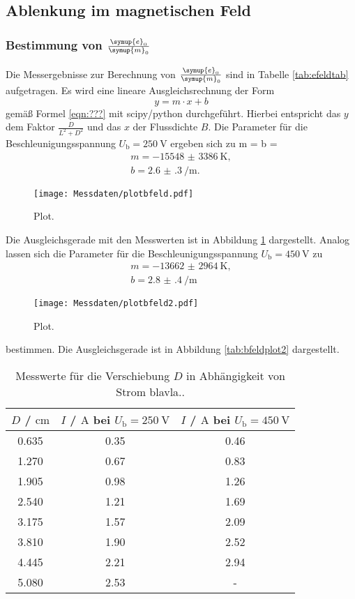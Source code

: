 \FloatBarrier
\subsection{Ablenkung im magnetischen Feld}

\subsubsection{Bestimmung von $\frac{\symup{e}_0}{\symup{m}_0}$}
Die Messergebnisse zur Berechnung von $\frac{\symup{e}_0}{\symup{m}_0}$ sind in Tabelle
\ref{tab:efeldtab} aufgetragen. Es wird eine lineare Ausgleichsrechnung der Form 
\begin{equation*}
	y = m \cdot x + b
\end{equation*}
gemäß Formel \eqref{eqn:???} mit scipy/python \cite{scipy} durchgeführt. Hierbei entspricht das
$y$ dem Faktor $\frac{D}{L^2+D^2}$ und das $x$ der Flussdichte $B$.
Die Parameter für die Beschleunigungsspannung $U_{\mathrm{b}}=\SI{250}{\volt}$ ergeben sich zu
m = b =  \begin{gather*}
	m = -\SI{15548(3386)}{\kelvin} \mathrm{,} \\
	b = \SI{2.6(3)}{\per\meter} \mathrm{.}
\end{gather*}
\begin{figure}
  \centering
  \texttt{[image: Messdaten/plotbfeld.pdf]}
  \caption{Plot.}
  \label{fig:bfeldplot}
\end{figure}
Die Ausgleichsgerade mit den Messwerten ist in Abbildung \ref{fig:bfeldplot} dargestellt.
Analog lassen sich die Parameter für die Beschleunigungsspannung $U_{\mathrm{b}}=\SI{450}{\volt}$
zu
\begin{gather*}
	m = -\SI{13662(2964)}{\kelvin} \mathrm{,} \\
	b = \SI{2.8(4)}{\per\meter}
\end{gather*}
\begin{figure}
  \centering
  \texttt{[image: Messdaten/plotbfeld2.pdf]}
  \caption{Plot.}
  \label{fig:bfeldplot2}
\end{figure}
bestimmen. Die Ausgleichsgerade ist in Abbildung \ref{tab:bfeldplot2} dargestellt. 
\begin{table}
	\caption{Messwerte für die Verschiebung $D$ in Abhängigkeit von Strom blavla..}
	\label{tab:bfeldtab}
	\centering
	\begin{tabular}{ccc}
	\toprule
		$D$ / $\si{\centi\meter}$ & $I$ / $\si{\ampere}$ bei $U_{\mathrm{b}}=\SI{250}{\volt}$ & $I$ / $\si{\ampere}$ bei $U_{\mathrm{b}}=\SI{450}{\volt}$ \\
	\midrule
		0.635 & 0.35 & 0.46 \\
		1.270 & 0.67 & 0.83 \\
		1.905 & 0.98 & 1.26 \\
		2.540 & 1.21 & 1.69 \\
		3.175 & 1.57 & 2.09 \\
		3.810 & 1.90 & 2.52 \\
		4.445 & 2.21 & 2.94 \\
		5.080 & 2.53 & - \\
	\bottomrule
	\end{tabular}
\end{table}
